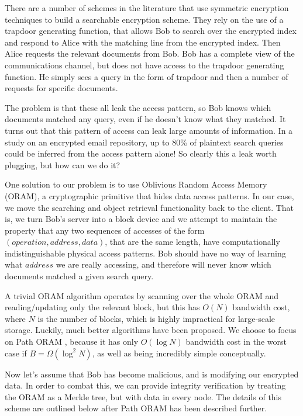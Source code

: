 \documentclass[12pt,a4paper,twoside]{article}
\begin{document}
There are a number of schemes in the literature that use symmetric encryption techniques to build a searchable encryption scheme. They rely on the use of a trapdoor generating function, that allows Bob to search over the encrypted index and respond to Alice with the matching line from the encrypted index. Then Alice requests the relevant documents from Bob. Bob has a complete view of the communications channel, but does not have access to the trapdoor generating function. He simply sees a query in the form of trapdoor and then a number of requests for specific documents.

The problem is that these all leak the access pattern, so Bob knows which documents matched any query, even if he doesn't know what they matched. It turns out that this pattern of access can leak large amounts of information. In a study \cite{islam2012access} on an encrypted email repository, up to 80\% of plaintext search queries could be inferred from the access pattern alone! So clearly this a leak worth plugging, but how can we do it? 


One solution to our problem is to use Oblivious Random Access Memory (ORAM), a cryptographic primitive that hides data access patterns. In our case, we move the searching and object retrieval functionality back to the client. That is, we turn Bob's server into a block device and we attempt to maintain the property that any two sequences of accesses of the form $(operation,address,data)$, that are the same length, have computationally indistinguishable physical access patterns. Bob should have no way of learning what $address$ we are really accessing, and therefore will never know which documents matched a given search query. 

A trivial ORAM algorithm operates by scanning over the whole ORAM and reading/updating only the relevant block, but this has $O(N)$ bandwidth cost, where $N$ is the number of blocks, which is highly impractical for large-scale storage. Luckily, much better algorithms have been proposed. We choose to focus on Path ORAM \cite{stefanov2013path}, because it has only $O(\log N)$ bandwidth cost in the worst case if $B = \Omega(\log^2 N)$, as well as being incredibly simple conceptually.


Now let's assume that Bob has become malicious, and is modifying our encrypted data. In order to combat this, we can provide integrity verification by treating the ORAM as a Merkle tree, but with data in every node. The details of this scheme are outlined below after Path ORAM has been described further.
\end{document}
